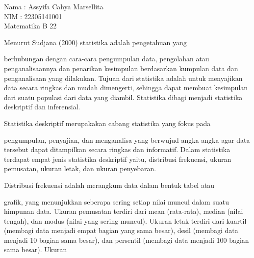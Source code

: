 \documentclass[a4paper,10pt]{article}
\begin{document}
\begin{eulernotebook}
\begin{eulercomment}
Nama : Assyifa Cahya Marsellita\\
NIM  : 22305141001\\
Matematika B 22

\end{eulercomment}
\begin{eulercomment}
\end{eulercomment}
\begin{eulerttcomment}
   Menurut Sudjana (2000) statistika adalah pengetahuan yang
\end{eulerttcomment}
\begin{eulercomment}
berhubungan dengan cara-cara pengumpulan data, pengolahan atau
penganalisaannya dan penarikan kesimpulan berdasarkan kumpulan data
dan penganalisaan yang dilakukan. Tujuan dari statistika adalah untuk
menyajikan data secara ringkas dan mudah dimengerti, sehingga dapat
membuat kesimpulan dari suatu populasi dari data yang diambil.
Statistika dibagi menjadi statistika deskriptif dan inferensial.\\
\end{eulercomment}
\begin{eulerttcomment}
   Statistika deskriptif merupakakan cabang statistika yang fokus pada
\end{eulerttcomment}
\begin{eulercomment}
pengumpulan, penyajian, dan menganalisa yang berwujud angka-angka agar
data tersebut dapat ditampilkan secara ringkas dan informatif. Dalam
statistika terdapat empat jenis statistika deskriptif yaitu,
distribusi frekuensi, ukuran pemusatan, ukuran letak, dan ukuran
penyebaran.\\
\end{eulercomment}
\begin{eulerttcomment}
   Distribusi frekuensi adalah merangkum data dalam bentuk tabel atau
\end{eulerttcomment}
\begin{eulercomment}
grafik, yang menunjukkan seberapa sering setiap nilai muncul dalam
suatu himpunan data. Ukuran pemusatan terdiri dari mean (rata-rata),
median (nilai tengah), dan modus (nilai yang sering muncul). Ukuran
letak terdiri dari kuartil (membagi data menjadi empat bagian yang
sama besar), desil (membagi data menjadi 10 bagian sama besar), dan
persentil (membagi data menjadi 100 bagian sama besar). Ukuran

\end{eulercomment}
\end{eulernotebook}
\end{document}
